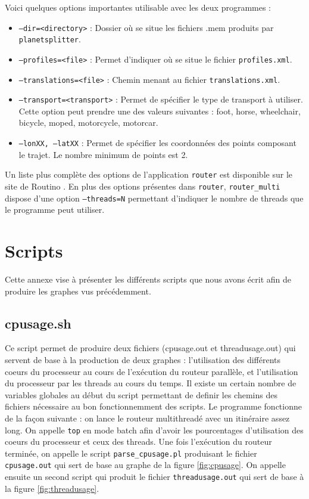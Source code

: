 \begin{appendices}
  Voici quelques options importantes utilisable avec les deux programmes : 
  
  \begin{itemize}
    \renewcommand{\labelitemi}{$\bullet$}
  \item \texttt{--dir=<directory>} : Dossier où se situe les fichiers .mem
    produits par \texttt{planetsplitter}.
  \item \texttt{--profiles=<file>} : Permet d'indiquer où se situe le 
    fichier \texttt{profiles.xml}.
  \item \texttt{--translations=<file>} : Chemin menant au fichier 
    \texttt{translations.xml}.
  \item \texttt{--transport=<transport>} : Permet de spécifier le type de 
    transport à utiliser. Cette option peut prendre une des valeurs suivantes 
    : foot, horse, wheelchair, bicycle, moped, motorcycle, motorcar.
  \item \texttt{--lonXX, --latXX} : Permet de spécifier les coordonnées des 
    points composant le trajet. Le nombre minimum de points est 2. 
  \end{itemize}

  Un liste plus complète des options de l'application \texttt{router} est
  disponible sur le site de Routino \cite{bishop_routino_????}. En plus des 
  options présentes dans \texttt{router}, \texttt{router\_multi} dispose d'une 
  option \texttt{--threads=N} permettant d'indiquer le nombre de threads que le 
  programme peut utiliser.
  
  \section{Scripts}
  \label{ann:scripts}
  
  Cette annexe vise à présenter les différents scripts que nous avons écrit 
  afin de produire les graphes vus précédemment.

  \subsection{cpusage.sh}
  \label{ann:cpusage}
  
  Ce script permet de produire deux fichiers (cpusage.out et threadusage.out)
  qui servent de base à la production de deux graphes : l'utilisation des 
  différents coeurs du processeur au cours de l'exécution du routeur parallèle, 
  et l'utilisation du processeur par les threads au cours du temps. Il existe un
  certain nombre de variables globales au début du script permettant de definir 
  les chemins des fichiers nécessaire au bon fonctionnemment des scripts. Le 
  programme fonctionne de la façon suivante : on lance le routeur multithreadé 
  avec un itinéraire assez long. On appelle \texttt{top} en mode batch afin d'avoir les 
  pourcentages d'utilisation des coeurs du processeur et ceux des threads. 
  Une fois l'exécution du routeur terminée, on appelle le script 
  \texttt{parse\_cpusage.pl} produisant le fichier \texttt{cpusage.out} qui 
  sert de base au graphe de la figure \ref{fig:cpusage}. On appelle ensuite 
  un second script qui produit le fichier \texttt{threadusage.out} qui sert de 
  base à la figure \ref{fig:threadusage}. 
  

\end{appendices}
